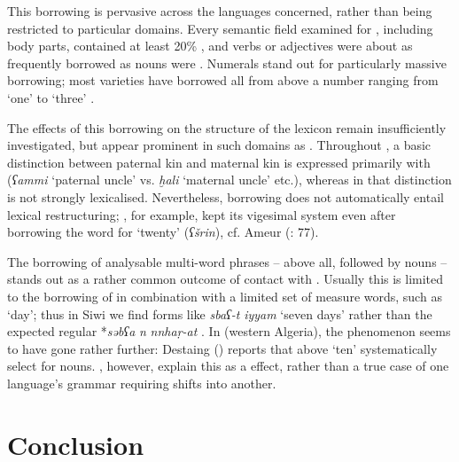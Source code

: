 \documentclass[output=paper]{langsci/langscibook}
\begin{document}
This borrowing is pervasive across the languages concerned, rather than being restricted to particular domains. Every semantic field examined for , including body parts, contained at least 20\% , and verbs or adjectives were about as frequently borrowed as nouns were \citep{Kossmann2009}. Numerals stand out for particularly massive borrowing; most   varieties have borrowed all  from  above a number ranging from `one' to `three' \citep{Souag2007}.

The effects of this borrowing on the structure of the lexicon remain insufficiently investigated, but appear prominent in such domains as . Throughout  , a basic distinction between paternal kin and maternal kin is expressed primarily with   (\textit{ʕammi} `paternal uncle' vs. \textit{ḫali} `maternal uncle' etc.), whereas in  that distinction is not strongly lexicalised. Nevertheless, borrowing does not automatically entail lexical restructuring; , for example, kept its vigesimal system even after borrowing the  word for `twenty' (\textit{ʕšrin}), cf. Ameur (\citeyear{Ameur2008}: 77).

The borrowing of analysable multi-word phrases – above all,  followed by nouns – stands out as a rather common outcome of  contact with . Usually this is limited to the borrowing of  in combination with a limited set of measure words, such as `day'; thus in Siwi we find forms like \textit{sbaʕ-t} \textit{iyyam} `seven days' rather than the expected regular  *\textit{səbʕa} \textit{n} \textit{nnhaṛ-at }\citep[114]{Souag2013book}. In  (western Algeria), the phenomenon seems to have gone rather further: Destaing (\citeyear[212]{Destaing1907}) reports that  above `ten' systematically select for  nouns.  \citet{SouagKherbache2016}, however, explain this as a  effect, rather than a true case of one language's grammar requiring shifts into another.
\largerpage

\section{Conclusion}
\end{document}
